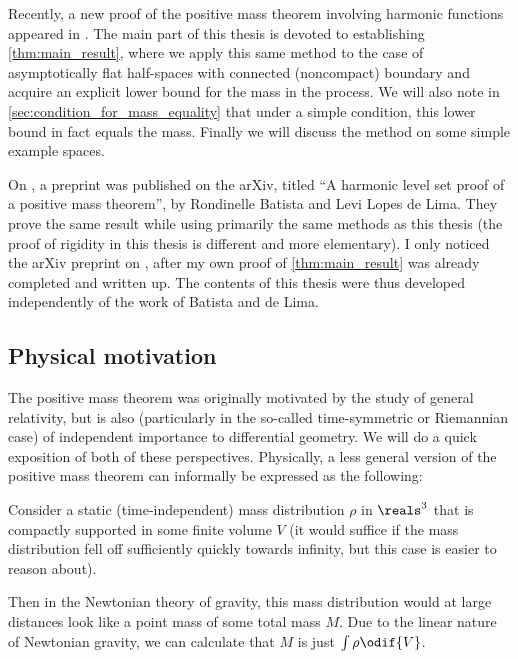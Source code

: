 \documentclass[titlepage,numbers=noenddot,oneside,%
cleardoublepage=empty,paper=a4,fontsize=11pt,%
english,%
]{scrartcl}
\begin{document}
Recently, a new proof of the positive mass theorem involving harmonic functions appeared in \cite{brayHarmonicFunctionsMass2019}. The main part of this thesis is devoted to establishing \cref{thm:main_result}, where we apply this same method to the case of asymptotically flat half-spaces with connected (noncompact) boundary and acquire an explicit lower bound for the mass in the process.  We will also note in \cref{sec:condition_for_mass_equality} that under a simple condition, this lower bound in fact equals the mass. Finally we will discuss the method on some simple example spaces.

\begin{remark}
    On , a preprint \cite{batistaHarmonicLevelSet2023} was published on the arXiv, titled \enquote{A harmonic level set proof of a positive mass theorem}, by Rondinelle Batista and Levi Lopes de Lima. They prove the same result while using primarily the same methods as this thesis (the proof of rigidity in this thesis is different and more elementary). I only noticed the arXiv preprint on , after my own proof of \cref{thm:main_result} was already completed and written up. The contents of this thesis were thus developed independently of the work of Batista and de Lima.
\end{remark}

\subsection{Physical motivation}
The positive mass theorem was originally motivated by the study of general relativity, but is also (particularly in the so-called time-symmetric or Riemannian case) of independent importance to differential geometry. We will do a quick exposition of both of these perspectives. Physically, a less general version of the positive mass theorem can informally be expressed as the following: 

Consider a static (\ie time-independent) mass distribution \( \rho \) in \( \reals^3 \) that is compactly supported in some finite volume \( V \) (it would suffice if the mass distribution fell off sufficiently quickly towards infinity, but this case is easier to reason about).

Then in the Newtonian theory of gravity, this mass distribution would at large distances look like a point mass of some total mass \( M \). Due to the linear nature of Newtonian gravity, we can calculate that \( M \) is just \( \int \rho \odif{V} \).
\end{document}
